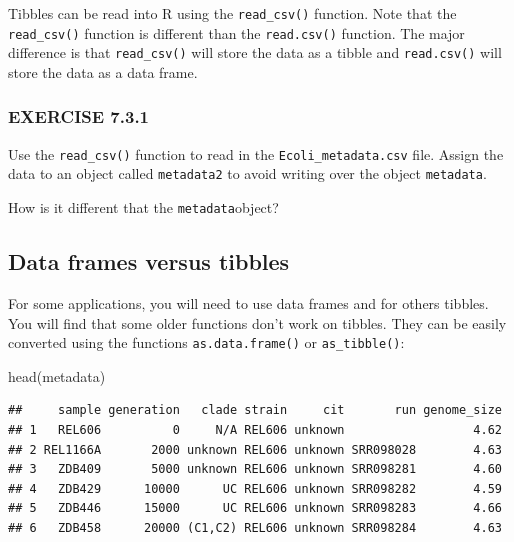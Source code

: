 \documentclass[
]{book}
\newenvironment{Shaded}{\begin{snugshade}}{\end{snugshade}}
\newcommand{\FunctionTok}[1]{\textcolor[rgb]{0.00,0.00,0.00}{#1}}
\newcommand{\NormalTok}[1]{#1}
\begin{document}
Tibbles can be read into R using the \texttt{read\_csv()} function. Note that the \texttt{read\_csv()} function is different than the \texttt{read.csv()} function. The major difference is that \texttt{read\_csv()} will store the data as a tibble and \texttt{read.csv()} will store the data as a data frame.

\hypertarget{exercise-7.3.1}{%
\subsubsection*{EXERCISE 7.3.1}\label{exercise-7.3.1}}

Use the \texttt{read\_csv()} function to read in the \texttt{Ecoli\_metadata.csv} file. Assign the data to an object called \texttt{metadata2} to avoid writing over the object \texttt{metadata}.

How is it different that the \texttt{metadata}object?

\hypertarget{data-frames-versus-tibbles}{%
\subsection*{Data frames versus tibbles}\label{data-frames-versus-tibbles}}

For some applications, you will need to use data frames and for others tibbles. You will find that some older functions don't work on tibbles. They can be easily converted using the functions \texttt{as.data.frame()} or \texttt{as\_tibble()}:

\begin{Shaded}
\begin{Highlighting}[]
\FunctionTok{head}\NormalTok{(metadata)}
\end{Highlighting}
\end{Shaded}

\begin{verbatim}
##     sample generation   clade strain     cit       run genome_size
## 1   REL606          0     N/A REL606 unknown                  4.62
## 2 REL1166A       2000 unknown REL606 unknown SRR098028        4.63
## 3   ZDB409       5000 unknown REL606 unknown SRR098281        4.60
## 4   ZDB429      10000      UC REL606 unknown SRR098282        4.59
## 5   ZDB446      15000      UC REL606 unknown SRR098283        4.66
## 6   ZDB458      20000 (C1,C2) REL606 unknown SRR098284        4.63
\end{verbatim}
\end{document}
